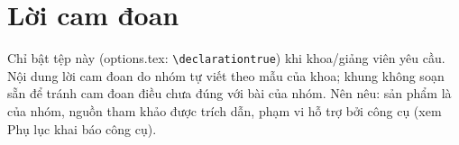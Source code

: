 \chapter*{Lời cam đoan}
\begin{huongdan}
Chỉ bật tệp này (options.tex: \texttt{\textbackslash declarationtrue}) khi khoa/giảng viên yêu cầu.
Nội dung lời cam đoan do nhóm tự viết theo mẫu của khoa; khung không soạn sẵn để tránh cam đoan
điều chưa đúng với bài của nhóm. Nên nêu: sản phẩm là của nhóm, nguồn tham khảo được trích dẫn,
phạm vi hỗ trợ bởi công cụ (xem Phụ lục khai báo công cụ).
\end{huongdan}
